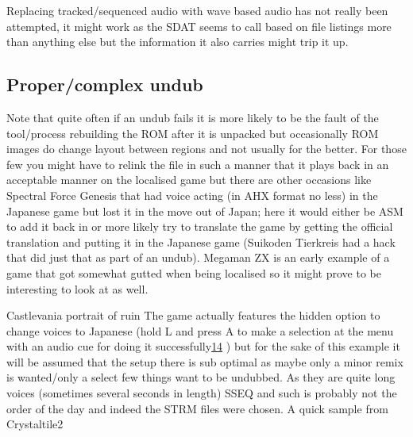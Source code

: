 \documentclass[
]{book}
\begin{document}
Replacing tracked/sequenced audio with wave based audio has not really been attempted, it might work as the SDAT seems to call based on file listings more than anything else but the information it also carries might trip it up.

\hypertarget{propercomplex-undub}{%
\subsection{Proper/complex undub}\label{propercomplex-undub}}

Note that quite often if an undub fails it is more likely to be the fault of the tool/process rebuilding the ROM after it is unpacked but occasionally ROM images do change layout between regions and not usually for the better. For those few you might have to relink the file in such a manner that it plays back in an acceptable manner on the localised game but there are other occasions like Spectral Force Genesis that had voice acting (in AHX format no less) in the Japanese game but lost it in the move out of Japan; here it would either be ASM to add it back in or more likely try to translate the game by getting the official translation and putting it in the Japanese game (Suikoden Tierkreis had a hack that did just that as part of an undub). Megaman ZX is an early example of a game that got somewhat gutted when being localised so it might prove to be interesting to look at as well.

Castlevania portrait of ruin The game actually features the hidden option to change voices to Japanese (hold L and press A to make a selection at the menu with an audio cue for doing it successfully\href{romhacking202015.html\#fn14x0}{14} ) but for the sake of this example it will be assumed that the setup there is sub optimal as maybe only a minor remix is wanted/only a select few things want to be undubbed. As they are quite long voices (sometimes several seconds in length) SSEQ and such is probably not the order of the day and indeed the STRM files were chosen. A quick sample from Crystaltile2
\end{document}
